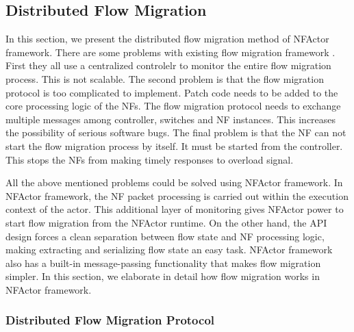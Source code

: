 

\subsection{Distributed Flow Migration}
\label{sec:fm}

In this section, we present the distributed flow migration method of NFActor
framework. There are some problems with existing flow migration
framework \cite{gember2015opennf, rajagopalan2013split}. First they all use a
centralized controlelr to monitor the entire flow migration
process. This is not scalable. The second problem is that the flow migration
protocol is too complicated to implement. Patch code needs to be added to the
core processing logic of the NFs. The flow migration protocol needs to exchange
multiple messages among controller, switches and NF instances. This increases
the possibility of serious software bugs. The final problem is that the NF can
not start the flow migration process by itself. It must be started from the
controller. This stops the NFs from making timely responses to overload signal.

All the above mentioned problems could be solved using NFActor framework. In
NFActor framework, the NF packet processing is carried out within the
execution context of the actor. This additional layer of monitoring gives
NFActor power to start flow migration from the NFActor runtime. On the other
hand, the API design forces a clean separation between flow state and NF
processing logic, making extracting and serializing flow state an easy task.
NFActor framework also has a built-in message-passing functionality that
makes flow migration simpler. In this section, we elaborate in detail how flow
migration works in NFActor framework.

\subsubsection{Distributed Flow Migration Protocol}

